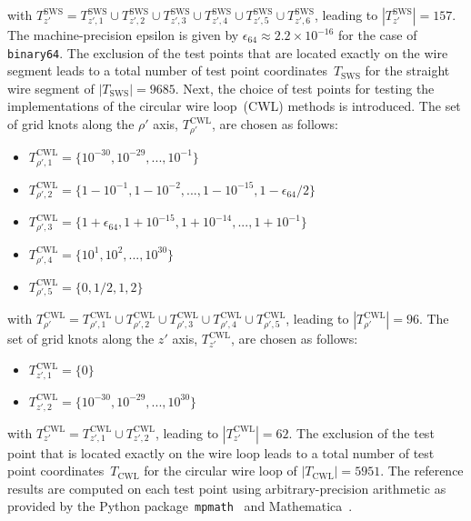 with $T^\mathrm{SWS}_{z'} = T^\mathrm{SWS}_{z',1} \cup T^\mathrm{SWS}_{z',2} \cup T^\mathrm{SWS}_{z',3} \cup T^\mathrm{SWS}_{z',4} \cup T^\mathrm{SWS}_{z',5} \cup T^\mathrm{SWS}_{z',6}$,
leading to $|T^\mathrm{SWS}_{z'}| = 157$.
The machine-precision epsilon is given by $\epsilon_{64} \approx 2.2 \times 10^{-16}$ for the case of \texttt{binary64}.
The exclusion of the test points that are located exactly on the wire segment leads to
a total number of test point coordinates~$T_\mathrm{SWS}$ for the straight wire segment of
$|T_\mathrm{SWS}| = 9685$.
Next, the choice of test points for testing the implementations
of the circular wire loop~(CWL) methods is introduced.
The set of grid knots along the $\rho'$ axis, $T^\mathrm{CWL}_{\rho'}$, are chosen as follows:
\begin{itemize}
  \item $T^\mathrm{CWL}_{\rho',1} = \{ 10^{-30}, 10^{-29}, ..., 10^{-1} \}$
  \item $T^\mathrm{CWL}_{\rho',2} = \{ 1 - 10^{-1}, 1 - 10^{-2}, ..., 1 - 10^{-15}, 1 - \epsilon_{64}/2 \}$
  \item $T^\mathrm{CWL}_{\rho',3} = \{ 1 + \epsilon_{64}, 1 + 10^{-15}, 1 + 10^{-14}, ..., 1 + 10^{-1} \}$
  \item $T^\mathrm{CWL}_{\rho',4} = \{ 10^{1}, 10^{2}, ..., 10^{30} \}$
  \item $T^\mathrm{CWL}_{\rho',5} = \{ 0, 1/2, 1, 2 \}$
\end{itemize}
with $T^\mathrm{CWL}_{\rho'} = T^\mathrm{CWL}_{\rho',1} \cup T^\mathrm{CWL}_{\rho',2} \cup T^\mathrm{CWL}_{\rho',3} \cup T^\mathrm{CWL}_{\rho',4} \cup T^\mathrm{CWL}_{\rho',5}$,
leading to $|T^\mathrm{CWL}_{\rho'}| = 96$.
The set of grid knots along the $z'$ axis, $T^\mathrm{CWL}_{z'}$, are chosen as follows:
\begin{itemize}
  \item $T^\mathrm{CWL}_{z',1} = \{ 0 \}$
  \item $T^\mathrm{CWL}_{z',2} = \{ 10^{-30}, 10^{-29}, ..., 10^{30} \}$
\end{itemize}
with $T^\mathrm{CWL}_{z'} = T^\mathrm{CWL}_{z',1} \cup T^\mathrm{CWL}_{z',2}$,
leading to $|T^\mathrm{CWL}_{z'}| = 62$.
The exclusion of the test point that is located exactly on the wire loop leads to
a total number of test point coordinates~$T_\mathrm{CWL}$ for the circular wire loop of
$|T_\mathrm{CWL}| = 5951$.
The reference results are computed on each test point using arbitrary-precision arithmetic
as provided by the Python package~\texttt{mpmath}~\cite{mpmath} and Mathematica~\cite{Mathematica}.
